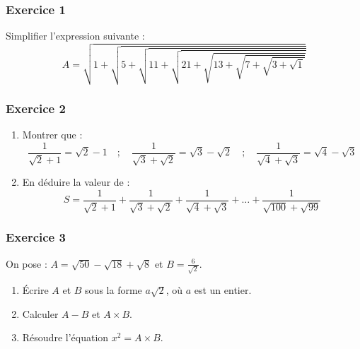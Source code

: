 \documentclass[12pt,a4paper]{article}
\begin{document}
\subsubsection*{\color{myred} Exercice 1}

Simplifier l'expression suivante :
\[
A = \sqrt{1 + \sqrt{5 + \sqrt{11 + \sqrt{21 + \sqrt{13 + \sqrt{7 + \sqrt{3 + \sqrt{1}}}}}}}}
\]

\vspace{0.4cm}

\subsubsection*{\color{myred} Exercice 2}

\begin{enumerate}
    \item Montrer que : 
    \[
    \frac{1}{\sqrt{2} + 1} = \sqrt{2} - 1 \quad ; \quad \frac{1}{\sqrt{3} + \sqrt{2}} = \sqrt{3} - \sqrt{2} \quad ; \quad \frac{1}{\sqrt{4} + \sqrt{3}} = \sqrt{4} - \sqrt{3}
    \]
    
    \item En déduire la valeur de :
    \[
    S = \frac{1}{\sqrt{2} + 1} + \frac{1}{\sqrt{3} + \sqrt{2}} + \frac{1}{\sqrt{4} + \sqrt{3}} + \dots + \frac{1}{\sqrt{100} + \sqrt{99}}
    \]
\end{enumerate}

\vspace{0.4cm}

\subsubsection*{\color{myred} Exercice 3}

On pose : $A = \sqrt{50} - \sqrt{18} + \sqrt{8}$ et $B = \frac{6}{\sqrt{2}}$.
\begin{enumerate}
    \item Écrire $A$ et $B$ sous la forme $a\sqrt{2}$, où $a$ est un entier.
    \item Calculer $A - B$ et $A \times B$.
    \item Résoudre l'équation $x^2 = A \times B$.
\end{enumerate}
\end{document}
